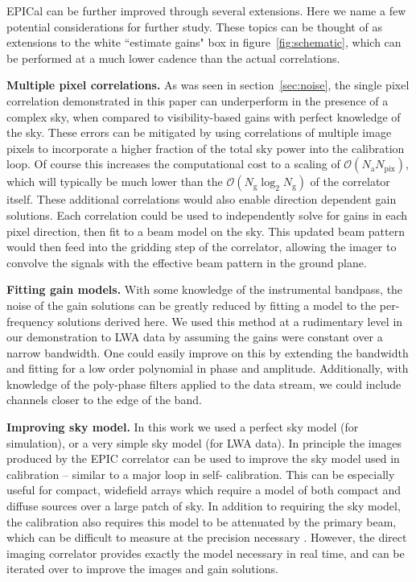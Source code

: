 \documentclass[a4paper,fleqn,usenatbib]{mnras}
\newcommand{\Nant}{\ensuremath{N_{\mathrm{a}}}}
\newcommand{\Ng}{\ensuremath{N_{\mathrm{g}}}}
\begin{document}
EPICal can be further improved through several extensions. Here we name a few potential 
considerations for further study. These topics can be thought of as extensions to the white 
``estimate gains" box in figure~\ref{fig:schematic}, which can be performed at a much lower 
cadence than the actual correlations.

\textbf{Multiple pixel correlations.} As was seen in section~\ref{sec:noise}, the single pixel 
correlation demonstrated in this paper can underperform in the presence of a complex sky, 
when compared to visibility-based gains with perfect knowledge of the sky. These errors can be 
mitigated by using correlations of multiple image pixels to incorporate a higher fraction of the 
total sky power into the calibration loop. Of course this increases the computational cost to a 
scaling of $\mathcal{O}(\Nant N_{\mathrm{pix}})$, which will typically be much lower than the 
$\mathcal{O}(\Ng \log_2 \Ng)$ of the correlator itself. These additional correlations would also 
enable direction dependent gain solutions. Each correlation could be used to independently 
solve for gains in each pixel direction, then fit to a beam model on the sky. This updated beam 
pattern would then feed into the gridding step of the correlator, allowing the imager to convolve 
the signals with the effective beam pattern in the ground plane. 

\textbf{Fitting gain models.} With some knowledge of the instrumental bandpass, the noise of 
the gain solutions can be greatly reduced by fitting a model to the per-frequency solutions 
derived here. We used this method at a rudimentary level in our demonstration to LWA data by 
assuming the gains were constant over a narrow bandwidth. One could easily improve on this 
by extending the bandwidth and fitting for a low order polynomial in phase and amplitude. 
Additionally, with knowledge of the poly-phase filters applied to the data stream, we could 
include channels closer to the edge of the band.

\textbf{Improving sky model.} In this work we used a perfect sky model (for simulation), or a 
very simple sky model (for LWA data). In principle the images produced by the EPIC correlator 
can be used to improve the sky model used in calibration -- similar to a major loop in self-
calibration. This can be especially useful for compact, widefield arrays which require a model of 
both compact and diffuse sources over a large patch of sky. In addition to requiring the sky 
model, the calibration also requires this model to be attenuated by the primary beam, which 
can be difficult to measure at the precision necessary \citep[e.g.][]{neb15,vir14,thy15b}. 
However, the direct imaging correlator provides exactly the model necessary in real time, and 
can be iterated over to improve the images and gain solutions.
\end{document}
